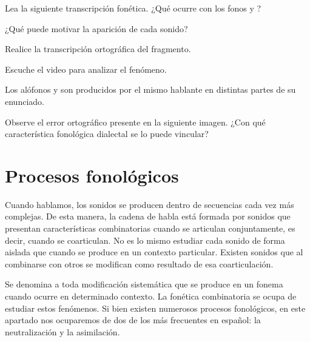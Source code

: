 \begin{ejercicio}\label{ej:03-video}
\begin{consignas}
  \item Lea la siguiente transcripción fonética. ¿Qué ocurre con los fonos
         y ?
  \item ¿Qué puede motivar la aparición de cada sonido?
  \item Realice la transcripción ortográfica del fragmento.
  \item Escuche el video para analizar el fenómeno.
\end{consignas}


\begin{resuelto}
Los alófonos  y  son producidos por el mismo hablante en
distintas partes de su enunciado.
\end{resuelto}
\end{ejercicio}

\begin{ejercicio}\label{ej:03-yendo}
Observe el error ortográfico presente en la siguiente imagen. ¿Con qué
característica fonológica dialectal se lo puede vincular?

\end{ejercicio}

\section{Procesos fonológicos}\label{sec:03-procesos}

Cuando hablamos, los sonidos se producen dentro de secuencias cada vez más
complejas. De esta manera, la cadena de habla está formada por sonidos que
presentan características combinatorias cuando se articulan conjuntamente, es
decir, cuando se coarticulan. No es lo mismo estudiar cada sonido de forma
aislada que cuando se produce en un contexto particular. Existen sonidos que al
combinarse con otros se modifican como resultado de esa coarticulación.

Se denomina  a toda modificación sistemática que se
produce en un fonema cuando ocurre en determinado contexto. La fonética
combinatoria se ocupa de estudiar estos fenómenos. Si bien existen numerosos
procesos fonológicos, en este apartado nos ocuparemos de dos de los más
frecuentes en español: la neutralización y la asimilación.

